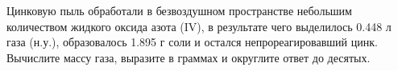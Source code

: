 
Цинковую
пыль обработали в безвоздушном пространстве небольшим количеством жидкого
оксида азота (IV), в результате чего выделилось 0.448 л газа (н.у.),
образовалось 1.895 г соли и остался непрореагировавший цинк. Вычислите массу
газа, выразите в граммах и округлите ответ до десятых.

